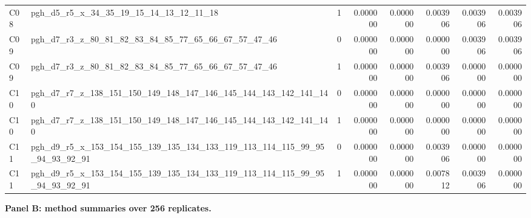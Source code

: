 {\begin{tabular}{llrrrrrr}
C08 & pgh\_d5\_r5\_x\_34\_35\_19\_15\_14\_13\_12\_11\_18 & 1 & 0.000000 & 0.000000 & 0.003906 & 0.003906 & 0.003906 \\
C09 & pgh\_d7\_r3\_z\_80\_81\_82\_83\_84\_85\_77\_65\_66\_67\_57\_47\_46 & 0 & 0.000000 & 0.000000 & 0.000000 & 0.003906 & 0.003906 \\
C09 & pgh\_d7\_r3\_z\_80\_81\_82\_83\_84\_85\_77\_65\_66\_67\_57\_47\_46 & 1 & 0.000000 & 0.000000 & 0.003906 & 0.000000 & 0.000000 \\
C10 & pgh\_d7\_r7\_z\_138\_151\_150\_149\_148\_147\_146\_145\_144\_143\_142\_141\_140 & 0 & 0.000000 & 0.000000 & 0.000000 & 0.000000 & 0.000000 \\
C10 & pgh\_d7\_r7\_z\_138\_151\_150\_149\_148\_147\_146\_145\_144\_143\_142\_141\_140 & 1 & 0.000000 & 0.000000 & 0.000000 & 0.000000 & 0.000000 \\
C11 & pgh\_d9\_r5\_x\_153\_154\_155\_139\_135\_134\_133\_119\_113\_114\_115\_99\_95\_94\_93\_92\_91 & 0 & 0.000000 & 0.000000 & 0.003906 & 0.000000 & 0.000000 \\
C11 & pgh\_d9\_r5\_x\_153\_154\_155\_139\_135\_134\_133\_119\_113\_114\_115\_99\_95\_94\_93\_92\_91 & 1 & 0.000000 & 0.000000 & 0.007812 & 0.003906 & 0.000000 \\
\bottomrule
\end{tabular}
}
\par

\noindent\textbf{Panel B: method summaries over 256 replicates.}\par
\noindent{}
\par
